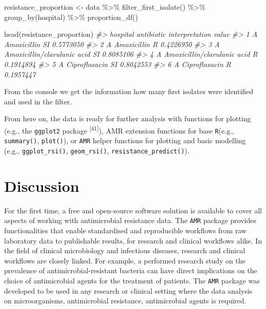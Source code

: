 \documentclass[
]{book}
\newenvironment{Shaded}{\begin{snugshade}}{\end{snugshade}}
\newcommand{\CommentTok}[1]{\textcolor[rgb]{0.56,0.35,0.01}{\textit{#1}}}
\newcommand{\FunctionTok}[1]{\textcolor[rgb]{0.00,0.00,0.00}{#1}}
\newcommand{\NormalTok}[1]{#1}
\newcommand{\OtherTok}[1]{\textcolor[rgb]{0.56,0.35,0.01}{#1}}
\newcommand{\SpecialCharTok}[1]{\textcolor[rgb]{0.00,0.00,0.00}{#1}}
\begin{document}
\begin{Shaded}
\begin{Highlighting}[]
\NormalTok{resistance\_proportion }\OtherTok{\textless{}{-}}\NormalTok{ data }\SpecialCharTok{\%\textgreater{}\%}
  \FunctionTok{filter\_first\_isolate}\NormalTok{() }\SpecialCharTok{\%\textgreater{}\%}
  \FunctionTok{group\_by}\NormalTok{(hospital) }\SpecialCharTok{\%\textgreater{}\%}
  \FunctionTok{proportion\_df}\NormalTok{()}

\FunctionTok{head}\NormalTok{(resistance\_proportion)}
\CommentTok{\#\textgreater{}   hospital                  antibiotic interpretation     value}
\CommentTok{\#\textgreater{} 1        A                 Amoxicillin             SI 0.5773050}
\CommentTok{\#\textgreater{} 2        A                 Amoxicillin              R 0.4226950}
\CommentTok{\#\textgreater{} 3        A Amoxicillin/clavulanic acid             SI 0.8085106}
\CommentTok{\#\textgreater{} 4        A Amoxicillin/clavulanic acid              R 0.1914894}
\CommentTok{\#\textgreater{} 5        A               Ciprofloxacin             SI 0.8042553}
\CommentTok{\#\textgreater{} 6        A               Ciprofloxacin              R 0.1957447}
\end{Highlighting}
\end{Shaded}

From the console we get the information how many first isolates were identified and used in the filter.

From here on, the data is ready for further analysis with functions for plotting (e.g., the \texttt{ggplot2} package \textsuperscript{{[}41{]}}), AMR extension functions for base \texttt{R}(e.g., \texttt{summary()}, \texttt{plot()}), or \texttt{AMR} helper functions for plotting and basic modelling (e.g., \texttt{ggplot\_rsi()}, \texttt{geom\_rsi()}, \texttt{resistance\_predict()}).

\hypertarget{discussion}{%
\section{Discussion}\label{discussion}}

For the first time, a free and open-source software solution is available to cover all aspects of working with antimicrobial resistance data. The \texttt{AMR} package provides functionalities that enable standardised and reproducible workflows from raw laboratory data to publishable results, for research and clinical workflows alike. In the field of clinical microbiology and infectious diseases, research and clinical workflows are closely linked. For example, a performed research study on the prevalence of antimicrobial-resistant bacteria can have direct implications on the choice of antimicrobial agents for the treatment of patients. The \texttt{AMR} package was developed to be used in any research or clinical setting where the data analysis on microorganisms, antimicrobial resistance, antimicrobial agents is required.
\end{document}
